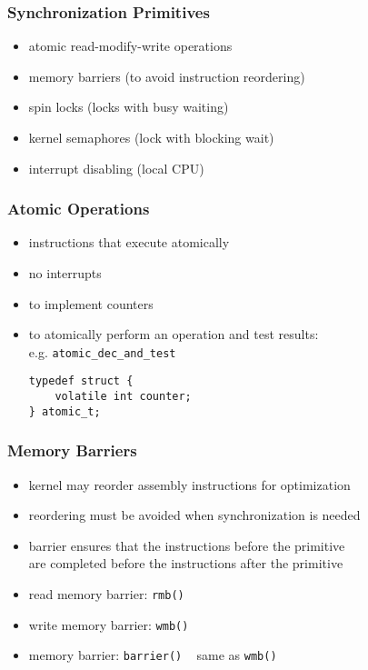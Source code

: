 \documentclass[dvipsnames]{beamer}
\begin{document}
\begin{frame}
  \frametitle{Synchronization Primitives}

  \begin{itemize}
    \item atomic read-modify-write operations
    \item memory barriers (to avoid instruction reordering)
    \item spin locks (locks with busy waiting)
    \item kernel semaphores (lock with blocking wait)
    \item interrupt disabling (local CPU)
  \end{itemize}
\end{frame}

\begin{frame}[fragile]
  \frametitle{Atomic Operations}

  \begin{itemize}
    \item instructions that execute atomically
    \item no interrupts

    \medskip
    \item to implement counters
    \item to atomically perform an operation and test results:\\
      e.g. \lstinline{atomic_dec_and_test}

    \medskip
    \begin{lstlisting}
typedef struct {
    volatile int counter;
} atomic_t;
    \end{lstlisting}
  \end{itemize}
\end{frame}

\begin{frame}
  \frametitle{Memory Barriers}

  \begin{itemize}
    \item kernel may reorder assembly instructions for optimization
    \item reordering must be avoided when synchronization is needed
    \item barrier ensures that the instructions before the primitive\\
      are completed before the instructions after the primitive

    \medskip
    \item read memory barrier: \lstinline|rmb()|
    \item write memory barrier: \lstinline|wmb()|
    \item memory barrier: \lstinline|barrier()|
      \textendash ~ same as \lstinline|wmb()|
  \end{itemize}
\end{frame}
\end{document}
